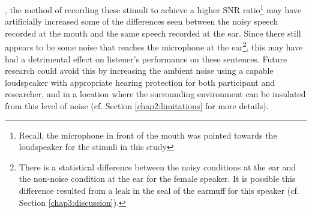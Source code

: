\DIFdelbegin {}\DIFdelend \DIFaddbegin {}\DIFaddend , the method of recording these stimuli to achieve a higher SNR ratio\footnote{Recall, the microphone in front of the mouth was pointed towards the loudspeaker for the stimuli in this study\DIFaddbegin {}\DIFaddend } may have artificially increased some of the differences seen between the noisy speech recorded at the mouth and the same speech recorded at the ear.  Since there still appears to be some noise that reaches the microphone at the ear\footnote{There is a statistical difference between the noisy conditions at the ear and the non-noise condition at the ear for the female speaker. It is possible this difference resulted from a leak in the seal of the earmuff for this speaker (cf. Section \ref{chap3:discussion}).}, this may have had a detrimental effect on listener's performance on these sentences.  Future research could avoid this by increasing the ambient noise using a capable loudspeaker with appropriate hearing protection for both participant and researcher, and in a location where the surrounding environment can be insulated from this level of noise (cf. Section \ref{chap2:limitations} for more details).




